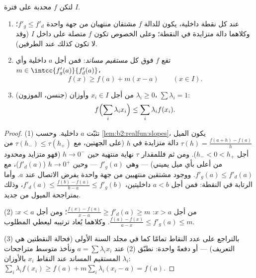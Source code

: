 \begin{theorem}\label{thm:b2:realfun:convexreg}
لتكن $f$ محدبة على فترة $I$.
\begin{enumerate}
  \item عند كل نقطة داخلية، يكون للدالة $f$ مشتقان منتهيان من جهة
        واحدة $f'_g \leq f'_d$؛ وكلاهما دالة متزايدة
        في النقطة؛ وعلى الخصوص تكون $f$ متصلة على
        داخل $I$ (وقد لا تكون كذلك عند الطرفين).
  \item تقع $f$ فوق كل \emph{مستقيم مساند}: فمن أجل $a$ داخلية
        وأي $m \in \intcc{f'_g(a)}{f'_d(a)}$،
        \[
        f(x) \geq f(a) + m(x - a) \qquad (x \in I).
        \]
  \item (جنسن، الموزون) من أجل $x_i \in I$ وأوزان $\lambda_i
        \geq 0$، $\sum\lambda_i = 1$:
        \[
        f\Bigl(\sum_i \lambda_i x_i\Bigr) \leq \sum_i \lambda_i
        f(x_i) .\index{متراجحة جنسن}
        \]
\end{enumerate}
\end{theorem}

\begin{proof}
(1) نثبّت $a$ داخلية. وحسب \cref{lem:b2:realfun:slopes}، يكون الميل
$\tau(h) = \frac{f(a + h) - f(a)}{h}$ دالة متزايدة في
$h$ (على الجهتين، مع $\tau(h_-) \leq \tau(h_+)$ من أجل $h_- < 0 <
h_+$). ومن ثم فللمقدار $\tau$ نهاية منتهية حين $h \to 0^-$ (فهو متزايد
ومحدود من أعلى بأي ميل يميني) --- وهي $f'_g(a)$ --- وحين
$h \to 0^+$ ($f'_d(a)$)، مع $f'_g(a) \leq f'_d(a)$. ووجود
مشتقين منتهيين من جهة واحدة يفرض الاتصال عند $a$. وأما الرتابة في
النقطة: فمن أجل $a < b$ داخليتين، $f'_d(a) \leq \frac{f(b) - f(a)}{b -
a} \leq f'_g(b)$، وذلك بمتراجحة الميول من جديد.

(2) من أجل $x > a$: $\frac{f(x) - f(a)}{x - a} \geq f'_d(a) \geq m$؛
ومن أجل $x < a$: $\frac{f(a) - f(x)}{a - x} \leq f'_g(a) \leq m$. وكلاهما
يُعاد ترتيبه ليعطي المطلوب.

(3) بالتراجع على عدد النقاط تمامًا كما في مجلد السنة
الأولى (فحالة النقطتين هي التعريف) --- أو دفعةً واحدة:
نطبّق (2) عند $a = \sum\lambda_i x_i$ ونأخذ متوسط متراجحات
المستقيم المساند عند النقاط $x_i$ بالأوزان $\lambda_i$: $\sum_i
\lambda_i f(x_i) \geq f(a) + m\sum_i\lambda_i(x_i - a) = f(a)$.
\end{proof}

